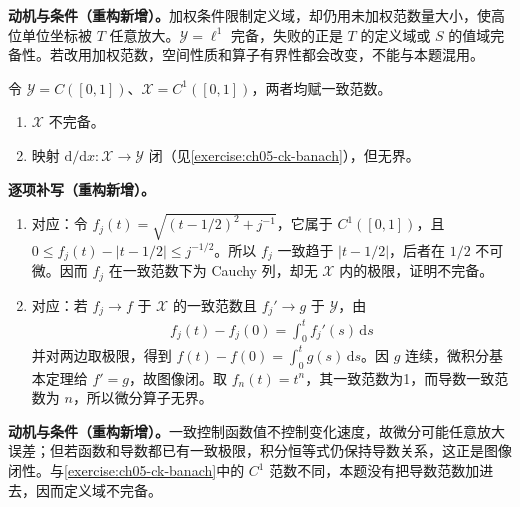 \documentclass[../../main.tex]{subfiles}
\begin{document}
\begin{remark}
\textbf{动机与条件（重构新增）。}加权条件限制定义域，却仍用未加权范数量大小，使高位单位坐标被 $T$ 任意放大。$\mathcal Y=\ell^1$ 完备，失败的正是 $T$ 的定义域或 $S$ 的值域完备性。若改用加权范数，空间性质和算子有界性都会改变，不能与本题混用。
\end{remark}
\begin{exercise}\label{exercise:ch05-derivative-incomplete}
令 $\mathcal Y=C([0,1])$、$\mathcal X=C^1([0,1])$，两者均赋一致范数。
\begin{enumerate}
\item\label{item:ch05-c1-uniform-incomplete} $\mathcal X$ 不完备。
\item\label{item:ch05-derivative-closed-unbounded} 映射 $\mathrm d/\mathrm dx:\mathcal X\to\mathcal Y$ 闭（见\cref{exercise:ch05-ck-banach}），但无界。
\end{enumerate}
\end{exercise}
\begin{solution}
\textbf{逐项补写（重构新增）。}
\begin{enumerate}
\item 对应：令 $f_j(t)=\sqrt{(t-1/2)^2+j^{-1}}$，它属于 $C^1([0,1])$，且 $0\le f_j(t)-|t-1/2|\le j^{-1/2}$。所以 $f_j$ 一致趋于 $|t-1/2|$，后者在 $1/2$ 不可微。因而 $f_j$ 在一致范数下为 Cauchy 列，却无 $\mathcal X$ 内的极限，证明不完备。
\item 对应：若 $f_j\to f$ 于 $\mathcal X$ 的一致范数且 $f_j'\to g$ 于 $\mathcal Y$，由
\begin{align*}
f_j(t)-f_j(0)=\int_0^t f_j'(s)\,\mathrm ds
\end{align*}
并对两边取极限，得到 $f(t)-f(0)=\int_0^tg(s)\,\mathrm ds$。因 $g$ 连续，微积分基本定理给 $f'=g$，故图像闭。取 $f_n(t)=t^n$，其一致范数为1，而导数一致范数为 $n$，所以微分算子无界。
\end{enumerate}
\end{solution}
\begin{remark}
\textbf{动机与条件（重构新增）。}一致控制函数值不控制变化速度，故微分可能任意放大误差；但若函数和导数都已有一致极限，积分恒等式仍保持导数关系，这正是图像闭性。与\cref{exercise:ch05-ck-banach}中的 $C^1$ 范数不同，本题没有把导数范数加进去，因而定义域不完备。
\end{remark}
\end{document}
